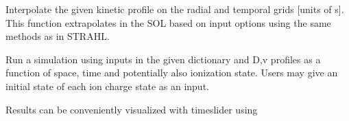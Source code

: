 \documentclass[letterpaper,10pt,english]{sphinxmanual}
\begin{document}
\begin{fulllineitems}
\begin{fulllineitems}
\end{fulllineitems}


\begin{fulllineitems}
\label{\detokenize{aurora:aurora.core.aurora_sim.interp_kin_prof}}
Interpolate the given kinetic profile on the radial and temporal grids {[}units of s{]}.
This function extrapolates in the SOL based on input options using the same methods as in STRAHL.

\end{fulllineitems}


\begin{fulllineitems}
\label{\detokenize{aurora:aurora.core.aurora_sim.run_aurora}}
Run a simulation using inputs in the given dictionary and D,v profiles as a function
of space, time and potentially also ionization state. Users may give an initial state of each
ion charge state as an input.

Results can be conveniently visualized with time\sphinxhyphen{}slider using


\end{fulllineitems}
\end{fulllineitems}
\end{document}
